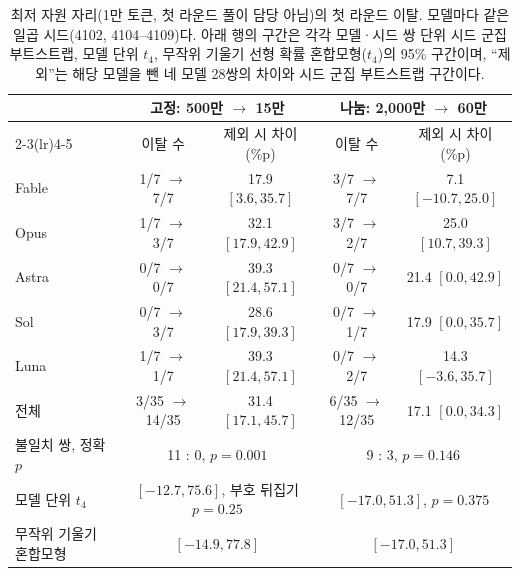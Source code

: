 \begin{table}[t]
\centering
\caption{최저 자원 자리(1만 토큰, 첫 라운드 풀이 담당 아님)의 첫 라운드 이탈. 모델마다 같은 일곱 시드(4102, 4104--4109)다. 아래 행의 구간은 각각 모델·시드 쌍 단위 시드 군집 부트스트랩, 모델 단위 $t_4$, 무작위 기울기 선형 확률 혼합모형($t_4$)의 95\% 구간이며, ``제외''는 해당 모델을 뺀 네 모델 28쌍의 차이와 시드 군집 부트스트랩 구간이다.}
\label{val:w3-tab-r1}
\small
\setlength{\tabcolsep}{4pt}
\begin{tabular}{lcccc}
\toprule
 & \multicolumn{2}{c}{고정: 500만 $\to$ 15만} & \multicolumn{2}{c}{나눔: 2,000만 $\to$ 60만} \\
\cmidrule(lr){2-3}\cmidrule(lr){4-5}
 & 이탈 수 & 제외 시 차이(\%p) & 이탈 수 & 제외 시 차이(\%p) \\
\midrule
Fable & 1/7 $\to$ 7/7 & 17.9 $[3.6, 35.7]$ & 3/7 $\to$ 7/7 & 7.1 $[-10.7, 25.0]$ \\
Opus & 1/7 $\to$ 3/7 & 32.1 $[17.9, 42.9]$ & 3/7 $\to$ 2/7 & 25.0 $[10.7, 39.3]$ \\
Astra & 0/7 $\to$ 0/7 & 39.3 $[21.4, 57.1]$ & 0/7 $\to$ 0/7 & 21.4 $[0.0, 42.9]$ \\
Sol & 0/7 $\to$ 3/7 & 28.6 $[17.9, 39.3]$ & 0/7 $\to$ 1/7 & 17.9 $[0.0, 35.7]$ \\
Luna & 1/7 $\to$ 1/7 & 39.3 $[21.4, 57.1]$ & 0/7 $\to$ 2/7 & 14.3 $[-3.6, 35.7]$ \\
\midrule
전체 & 3/35 $\to$ 14/35 & 31.4 $[17.1, 45.7]$ & 6/35 $\to$ 12/35 & 17.1 $[0.0, 34.3]$ \\
불일치 쌍, 정확 $p$ & \multicolumn{2}{c}{11 : 0, $p=0.001$} & \multicolumn{2}{c}{9 : 3, $p=0.146$} \\
모델 단위 $t_4$ & \multicolumn{2}{c}{$[-12.7, 75.6]$, 부호 뒤집기 $p=0.25$} & \multicolumn{2}{c}{$[-17.0, 51.3]$, $p=0.375$} \\
무작위 기울기 혼합모형 & \multicolumn{2}{c}{$[-14.9, 77.8]$} & \multicolumn{2}{c}{$[-17.0, 51.3]$} \\
\bottomrule
\end{tabular}
\end{table}

